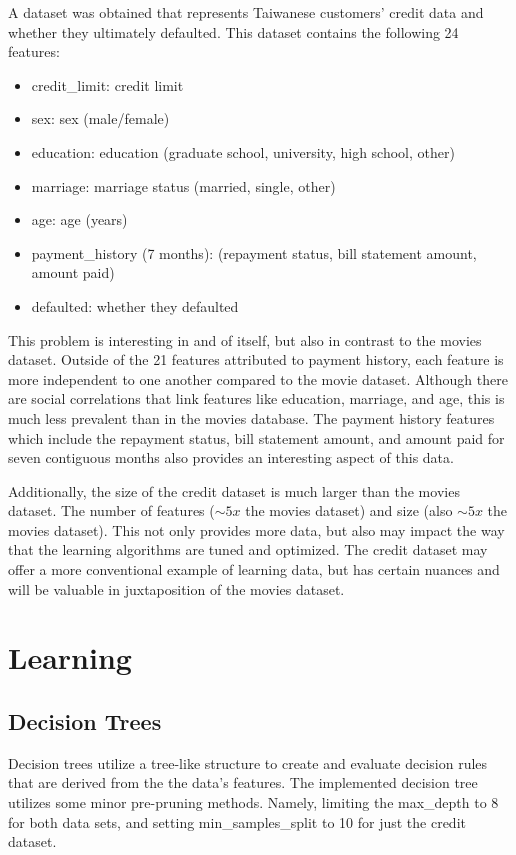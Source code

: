 \documentclass{article}
\begin{document}
A dataset was obtained that represents Taiwanese customers' credit data and whether they ultimately defaulted. This dataset contains the following 24 features:
\begin{itemize}
    \item credit\_limit: credit limit
    \item sex: sex (male/female)
    \item education: education (graduate school, university, high school, other)
    \item marriage: marriage status (married, single, other)
    \item age: age (years)
    \item payment\_history (7 months): (repayment status, bill statement amount, amount paid)
    \item defaulted: whether they defaulted
\end{itemize}

This problem is interesting in and of itself, but also in contrast to the movies dataset. Outside of the 21 features attributed to payment history, each feature is more independent to one another compared to the movie dataset. Although there are social correlations that link features like education, marriage, and age, this is much less prevalent than in the movies database. The payment history features which include the repayment status, bill statement amount, and amount paid for seven contiguous months also provides an interesting aspect of this data.

Additionally, the size of the credit dataset is much larger than the movies dataset. The number of features ($\sim 5x$ the movies dataset) and size (also $\sim 5x$ the movies dataset). This not only provides more data, but also may impact the way that the learning algorithms are tuned and optimized. The credit dataset may offer a more conventional example of learning data, but has certain nuances and will be valuable in juxtaposition of the movies dataset.

\pagebreak
\section{Learning}

\subsection{Decision Trees}

Decision trees utilize a tree-like structure to create and evaluate decision rules that are derived from the the data's features. The implemented decision tree utilizes some minor pre-pruning methods. Namely, limiting the max\_depth to 8 for both data sets, and setting min\_samples\_split to 10 for just the credit dataset.
\end{document}
